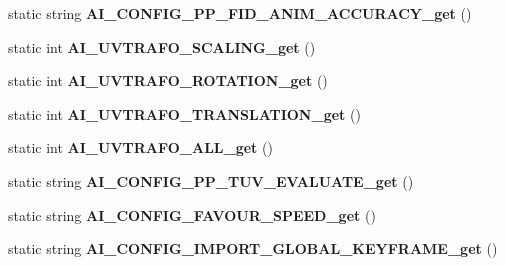 \begin{DoxyCompactItemize}
\item 
\hypertarget{class_assimp_p_i_n_v_o_k_e_a1a8e5431eec9bfeb29e6863a438f5eac}{static string {\bfseries A\+I\+\_\+\+C\+O\+N\+F\+I\+G\+\_\+\+P\+P\+\_\+\+F\+I\+D\+\_\+\+A\+N\+I\+M\+\_\+\+A\+C\+C\+U\+R\+A\+C\+Y\+\_\+get} ()}\label{class_assimp_p_i_n_v_o_k_e_a1a8e5431eec9bfeb29e6863a438f5eac}

\item 
\hypertarget{class_assimp_p_i_n_v_o_k_e_a230948430e51bfe2971a03ac793c672b}{static int {\bfseries A\+I\+\_\+\+U\+V\+T\+R\+A\+F\+O\+\_\+\+S\+C\+A\+L\+I\+N\+G\+\_\+get} ()}\label{class_assimp_p_i_n_v_o_k_e_a230948430e51bfe2971a03ac793c672b}

\item 
\hypertarget{class_assimp_p_i_n_v_o_k_e_aa54e145c65c2705c1ee70f2f3b559723}{static int {\bfseries A\+I\+\_\+\+U\+V\+T\+R\+A\+F\+O\+\_\+\+R\+O\+T\+A\+T\+I\+O\+N\+\_\+get} ()}\label{class_assimp_p_i_n_v_o_k_e_aa54e145c65c2705c1ee70f2f3b559723}

\item 
\hypertarget{class_assimp_p_i_n_v_o_k_e_a6ac7f21baa317bdb363be5f8bb3a606f}{static int {\bfseries A\+I\+\_\+\+U\+V\+T\+R\+A\+F\+O\+\_\+\+T\+R\+A\+N\+S\+L\+A\+T\+I\+O\+N\+\_\+get} ()}\label{class_assimp_p_i_n_v_o_k_e_a6ac7f21baa317bdb363be5f8bb3a606f}

\item 
\hypertarget{class_assimp_p_i_n_v_o_k_e_a30cb7d8c8998df58802565b2624b36cd}{static int {\bfseries A\+I\+\_\+\+U\+V\+T\+R\+A\+F\+O\+\_\+\+A\+L\+L\+\_\+get} ()}\label{class_assimp_p_i_n_v_o_k_e_a30cb7d8c8998df58802565b2624b36cd}

\item 
\hypertarget{class_assimp_p_i_n_v_o_k_e_ab865b4b2c33169d04d503d903f36fd65}{static string {\bfseries A\+I\+\_\+\+C\+O\+N\+F\+I\+G\+\_\+\+P\+P\+\_\+\+T\+U\+V\+\_\+\+E\+V\+A\+L\+U\+A\+T\+E\+\_\+get} ()}\label{class_assimp_p_i_n_v_o_k_e_ab865b4b2c33169d04d503d903f36fd65}

\item 
\hypertarget{class_assimp_p_i_n_v_o_k_e_ab84a710d267370c640d69b6bb70919a3}{static string {\bfseries A\+I\+\_\+\+C\+O\+N\+F\+I\+G\+\_\+\+F\+A\+V\+O\+U\+R\+\_\+\+S\+P\+E\+E\+D\+\_\+get} ()}\label{class_assimp_p_i_n_v_o_k_e_ab84a710d267370c640d69b6bb70919a3}

\item 
\hypertarget{class_assimp_p_i_n_v_o_k_e_a63d8fe4f7f4bef54c81e38b3a789945b}{static string {\bfseries A\+I\+\_\+\+C\+O\+N\+F\+I\+G\+\_\+\+I\+M\+P\+O\+R\+T\+\_\+\+G\+L\+O\+B\+A\+L\+\_\+\+K\+E\+Y\+F\+R\+A\+M\+E\+\_\+get} ()}\label{class_assimp_p_i_n_v_o_k_e_a63d8fe4f7f4bef54c81e38b3a789945b}


\end{DoxyCompactItemize}
